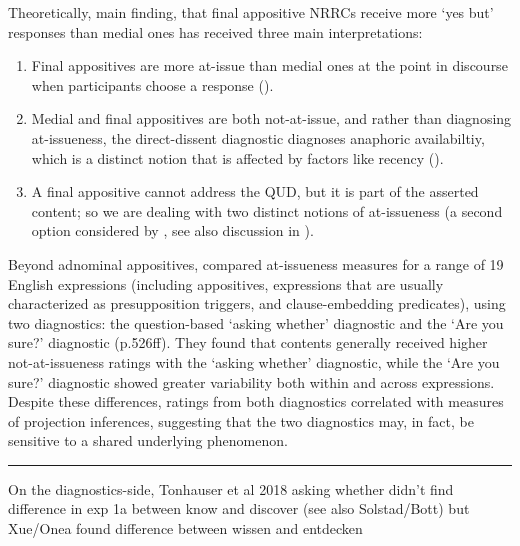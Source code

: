 \documentclass[times,linguex,xcolor]{glossa}
\begin{document}
  Theoretically,  main finding, that final appositive NRRCs receive more `yes but' responses than medial ones has received three main interpretations:
  \begin{enumerate}

    \item Final appositives are more at-issue than medial ones at the point in discourse when participants choose a response (\citealt{syrett_experimental_2015,jasinskaja_not_2016}).

    \item Medial and final appositives are both not-at-issue, and rather than diagnosing at-issueness, the direct-dissent diagnostic diagnoses anaphoric availabiltiy, which is a distinct notion that is affected by factors like recency (\citealt{snider_anaphoric_2017,snider_at-issuenessne_2017,snider_distinguishing_2018}).

    \item  A final appositive cannot address the QUD, but it is part of the asserted content; so we are dealing with two distinct notions of at-issueness (a second option considered by \citet{snider_anaphoric_2017}, see also discussion in \citealt{koev_notions_2018}).

  \end{enumerate}

  Beyond adnominal appositives, \citealt{tonhauser_how_2018} compared at-issueness measures for a range of 19 English expressions (including appositives, expressions that are usually characterized as presupposition triggers, and clause-embedding predicates), using two diagnostics: the question-based `asking whether' diagnostic and the `Are you sure?' diagnostic (p.526ff). They found that contents generally received higher not-at-issueness ratings with the `asking whether' diagnostic, while the `Are you sure?' diagnostic showed greater variability both within and across expressions. Despite these differences, ratings from both diagnostics correlated with measures of projection inferences, suggesting that the two diagnostics may, in fact, be sensitive to a shared underlying phenomenon.


  \bigskip \hrule\bigskip
  On the diagnostics-side, Tonhauser et al 2018 asking whether didn’t find difference in exp 1a between know and discover (see also Solstad/Bott) but Xue/Onea found difference between wissen and entdecken
\end{document}
